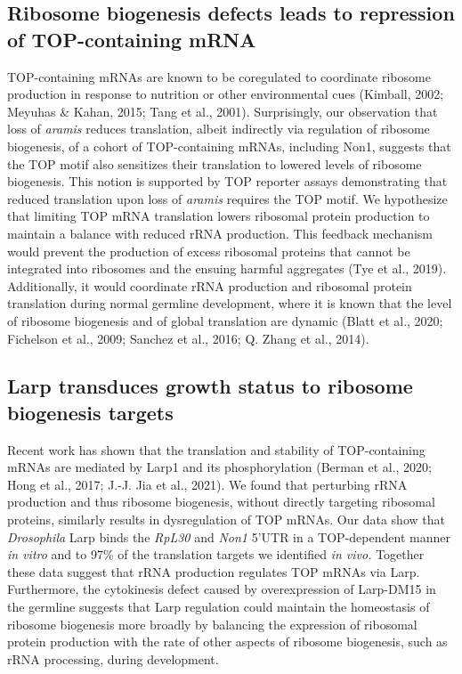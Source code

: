 \documentclass[12pt,oneside]{reedthesis}
\begin{document}
\hypertarget{ribosome-biogenesis-defects-leads-to-repression-of-top-containing-mrna}{%
\subsection{Ribosome biogenesis defects leads to repression of TOP-containing mRNA}\label{ribosome-biogenesis-defects-leads-to-repression-of-top-containing-mrna}}

TOP-containing mRNAs are known to be coregulated to coordinate ribosome production in response to nutrition or other environmental cues (Kimball, 2002; Meyuhas \& Kahan, 2015; Tang et al., 2001). Surprisingly, our observation that loss of \emph{aramis} reduces translation, albeit indirectly via regulation of ribosome biogenesis, of a cohort of TOP-containing mRNAs, including Non1, suggests that the TOP motif also sensitizes their translation to lowered levels of ribosome biogenesis. This notion is supported by TOP reporter assays demonstrating that reduced translation upon loss of \emph{aramis} requires the TOP motif. We hypothesize that limiting TOP mRNA translation lowers ribosomal protein production to maintain a balance with reduced rRNA production. This feedback mechanism would prevent the production of excess ribosomal proteins that cannot be integrated into ribosomes and the ensuing harmful aggregates (Tye et al., 2019). Additionally, it would coordinate rRNA production and ribosomal protein translation during normal germline development, where it is known that the level of ribosome biogenesis and of global translation are dynamic (Blatt et al., 2020; Fichelson et al., 2009; Sanchez et al., 2016; Q. Zhang et al., 2014).

\hypertarget{larp-transduces-growth-status-to-ribosome-biogenesis-targets}{%
\subsection{Larp transduces growth status to ribosome biogenesis targets}\label{larp-transduces-growth-status-to-ribosome-biogenesis-targets}}

Recent work has shown that the translation and stability of TOP-containing mRNAs are mediated by Larp1 and its phosphorylation (Berman et al., 2020; Hong et al., 2017; J.-J. Jia et al., 2021). We found that perturbing rRNA production and thus ribosome biogenesis, without directly targeting ribosomal proteins, similarly results in dysregulation of TOP mRNAs. Our data show that \emph{Drosophila} Larp binds the \emph{RpL30} and \emph{Non1} 5'UTR in a TOP-dependent manner \emph{in vitro} and to 97\% of the translation targets we identified \emph{in vivo.} Together these data suggest that rRNA production regulates TOP mRNAs via Larp. Furthermore, the cytokinesis defect caused by overexpression of Larp-DM15 in the germline suggests that Larp regulation could maintain the homeostasis of ribosome biogenesis more broadly by balancing the expression of ribosomal protein production with the rate of other aspects of ribosome biogenesis, such as rRNA processing, during development.
\end{document}
